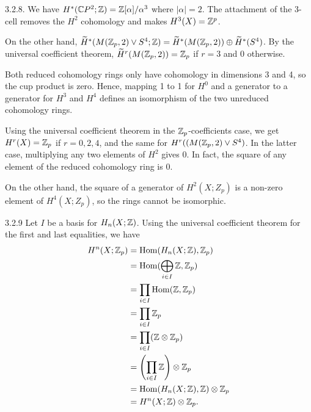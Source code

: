 \documentclass{article}
\begin{document}
 3.2.8. We have $H^*(\mathbb{C} P^2; \mathbb{Z}) = \mathbb{Z}[\alpha]/\alpha^3$ where $|\alpha| = 2$.
The attachment of the 3-cell removes the $H^2$ cohomology and makes $H^3(X) = \mathbb{Z}^p$.

On the other hand, $\widetilde H^*(M(\mathbb{Z}_p, 2) \vee S^4; \mathbb{Z}) = \widetilde H^*(M(\mathbb{Z}_p, 2)) \oplus \widetilde H^*(S^4)$.  By the universal coefficient theorem, $\widetilde H^r(M(\mathbb{Z}_p, 2)) = \mathbb{Z}_p$ if $r = 3$ and $0$ otherwise.

Both reduced cohomology rings only have cohomology in dimensions 3 and 4, so the cup product is zero.  Hence, mapping 1 to 1 for $H^0$ and a generator to a generator for $H^3$ and $H^4$ defines an isomorphism of the two unreduced cohomology rings.

Using the universal coefficient theorem in the $\mathbb{Z}_p$-coefficients case, we get 
$H^r(X) = \mathbb{Z}_p$ if $r = 0,2,4$, and the same for $H^r((M(\mathbb{Z}_p, 2) \vee S^4)$.  In the latter case, multiplying any two elements of $H^2$ gives $0$. In fact, the square of any element of the reduced cohomology ring is $0$.

On the other hand, the square of a generator of $H^2(X;Z_p)$ is a non-zero element of $H^4(X;Z_p)$, so the rings cannot be isomorphic.

 3.2.9 Let $I$ be a basis for $H_n(X; \mathbb{Z})$. Using the universal coefficient theorem for the first and last equalities, we have
\begin{align*}
H^n(X; \mathbb{Z}_p) & = \operatorname{Hom}(H_n(X; \mathbb{Z}), \mathbb{Z}_p) \\
& = \operatorname{Hom}(\bigoplus_{i \in I} \mathbb{Z}, \mathbb{Z}_p) \\
& = \prod_{i \in I} \operatorname{Hom}(\mathbb{Z}, \mathbb{Z}_p) \\
& = \prod_{i \in I} \mathbb{Z}_p \\
& = \prod_{i \in I} (\mathbb{Z} \otimes \mathbb{Z}_p) \\
& = \left( \prod_{i \in I} \mathbb{Z} \right) \otimes \mathbb{Z}_p \\
& = \operatorname{Hom}(H_n(X; \mathbb{Z}), \mathbb{Z}) \otimes \mathbb{Z}_p \\
& = H^n(X; \mathbb{Z}) \otimes \mathbb{Z}_p.
\end{align*}
\end{document}
